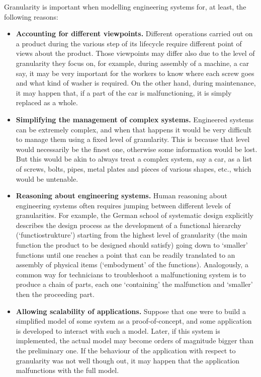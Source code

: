 \documentclass[
]{ceurart}
\begin{document}
Granularity is important when modelling engineering systems for, at least, the following reasons:
\begin{itemize}
    \item \textbf{Accounting for different viewpoints.} Different operations carried out on a product during the various step of its lifecycle require different point of views about the product. Those viewpoints may differ also due to the level of granularity they focus on, for example, during assembly of a machine, a car say, it may be very important for the workers to know where each screw goes and what kind of washer is required. On the other hand, during maintenance, it may happen that, if a part of the car is malfunctioning, it is simply replaced as a whole.%
    \item \textbf{Simplifying the management of complex systems.} Engineered systems can be extremely complex, and when that happens it would be very difficult to manage them using a fixed level of granularity. This is because that level would necessarily be the finest one, otherwise some information would be lost. But this would be akin to always treat a complex system, say a car, as a list of screws, bolts, pipes, metal plates and pieces of various shapes, etc., which would be untenable.
    \item \textbf{Reasoning about engineering systems.} Human reasoning about engineering systems often requires jumping between different levels of granularities. For example, the German school of systematic design \cite{pahl_engineering_2007} explicitly describes the design process as the development of a functional hierarchy (`functiostrukture') starting from the highest level of granularity (the main function the product to be designed should satisfy) going down to `smaller' functions until one reaches a point that can be readily translated to an assembly of physical items (`embodyment' of the functions). Analogously, a common way for technicians to troubleshoot a malfunctioning system is to produce a chain of parts, each one `containing' the malfunction and `smaller' then the proceeding part. %
    \item \textbf{Allowing scalability of applications.} Suppose that one were to build a simplified model of some system as a proof-of-concept, and some application is developed to interact with such a model. Later, if this system is implemented, the actual model may become orders of magnitude bigger than the preliminary one. If the behaviour of the application with respect to granularity was not well though out, it may happen that the application malfunctions with the full model.    
\end{itemize}
\end{document}
